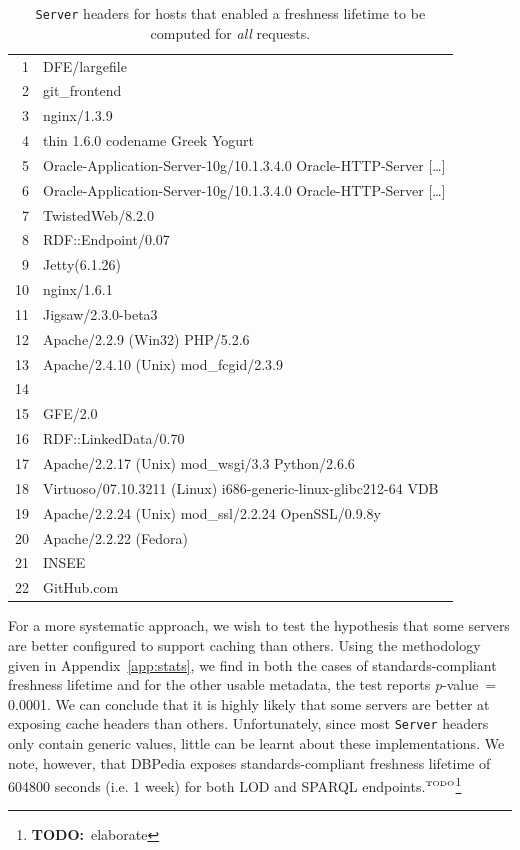 \documentclass{llncs}
\newcommand{\pvalue}{\textit{p}-value\ }
\newcommand{\httph}[1]{\texttt{#1}}
\newcommand{\todo}[1]{\ensuremath{^{\textrm{\tiny{TODO}\normalsize}}}\footnote{\textbf{TODO:}~#1}}
\begin{document}
\begin{table}[h]
  \caption{\httph{Server} headers for hosts that enabled a freshness
    lifetime to be computed for \emph{all} requests.}\label{tab:servers}
\begin{center}
\begin{tabular}{rl}
  \hline
  1 & DFE/largefile \\ 
  2 & git\_frontend \\ 
  3 & nginx/1.3.9 \\ 
  4 & thin 1.6.0 codename Greek Yogurt \\ 
  5 & Oracle-Application-Server-10g/10.1.3.4.0 Oracle-HTTP-Server [\ldots]\\
  6 & Oracle-Application-Server-10g/10.1.3.4.0 Oracle-HTTP-Server [\ldots]\\
  7 & TwistedWeb/8.2.0 \\ 
  8 & RDF::Endpoint/0.07 \\ 
  9 & Jetty(6.1.26) \\ 
  10 & nginx/1.6.1 \\ 
  11 & Jigsaw/2.3.0-beta3 \\ 
  12 & Apache/2.2.9 (Win32) PHP/5.2.6 \\ 
  13 & Apache/2.4.10 (Unix) mod\_fcgid/2.3.9 \\ 
  14 &  \\ 
  15 & GFE/2.0 \\ 
  16 & RDF::LinkedData/0.70 \\ 
  17 & Apache/2.2.17 (Unix) mod\_wsgi/3.3 Python/2.6.6 \\ 
  18 & Virtuoso/07.10.3211 (Linux) i686-generic-linux-glibc212-64  VDB \\ 
  19 & Apache/2.2.24 (Unix) mod\_ssl/2.2.24 OpenSSL/0.9.8y \\ 
  20 & Apache/2.2.22 (Fedora) \\ 
  21 & INSEE \\ 
  22 & GitHub.com \\ 
   \hline
\end{tabular}
\end{center}
\end{table}



For a more systematic approach, we wish to test the hypothesis that
some servers are better configured to support caching than others.
Using the methodology given in Appendix~\ref{app:stats}, we find in
both the cases of standards-compliant freshness lifetime and for the other
usable metadata, the test reports \pvalue = 0.0001. We can conclude
that it is highly likely that some servers are better at exposing
cache headers than others. Unfortunately, since most \httph{Server}
headers only contain generic values, little can be learnt about these
implementations. We note, however, that DBPedia exposes
standards-compliant freshness lifetime of 604800 seconds (i.e. 1 week) for
both LOD and SPARQL endpoints.\todo{elaborate}
\end{document}
